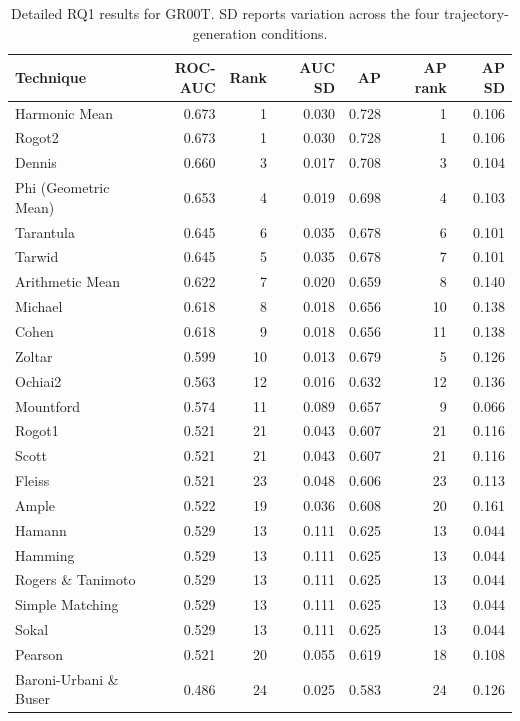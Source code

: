 \begin{table}[t]
\centering
\caption{Detailed RQ1 results for GR00T. SD reports variation across the four trajectory-generation conditions.}
\label{tab:rq1-supplementary-gr00t}
{\scriptsize
\setlength{\tabcolsep}{4pt}
\renewcommand{\arraystretch}{0.96}
\begin{tabular}{lrrrrrr}
\toprule
Technique & ROC-AUC & Rank & AUC SD & AP & AP rank & AP SD \\
\midrule
Harmonic Mean & 0.673 & 1 & 0.030 & 0.728 & 1 & 0.106 \\
Rogot2 & 0.673 & 1 & 0.030 & 0.728 & 1 & 0.106 \\
Dennis & 0.660 & 3 & 0.017 & 0.708 & 3 & 0.104 \\
Phi (Geometric Mean) & 0.653 & 4 & 0.019 & 0.698 & 4 & 0.103 \\
Tarantula & 0.645 & 6 & 0.035 & 0.678 & 6 & 0.101 \\
Tarwid & 0.645 & 5 & 0.035 & 0.678 & 7 & 0.101 \\
Arithmetic Mean & 0.622 & 7 & 0.020 & 0.659 & 8 & 0.140 \\
Michael & 0.618 & 8 & 0.018 & 0.656 & 10 & 0.138 \\
Cohen & 0.618 & 9 & 0.018 & 0.656 & 11 & 0.138 \\
Zoltar & 0.599 & 10 & 0.013 & 0.679 & 5 & 0.126 \\
Ochiai2 & 0.563 & 12 & 0.016 & 0.632 & 12 & 0.136 \\
Mountford & 0.574 & 11 & 0.089 & 0.657 & 9 & 0.066 \\
Rogot1 & 0.521 & 21 & 0.043 & 0.607 & 21 & 0.116 \\
Scott & 0.521 & 21 & 0.043 & 0.607 & 21 & 0.116 \\
Fleiss & 0.521 & 23 & 0.048 & 0.606 & 23 & 0.113 \\
Ample & 0.522 & 19 & 0.036 & 0.608 & 20 & 0.161 \\
Hamann & 0.529 & 13 & 0.111 & 0.625 & 13 & 0.044 \\
Hamming & 0.529 & 13 & 0.111 & 0.625 & 13 & 0.044 \\
Rogers \& Tanimoto & 0.529 & 13 & 0.111 & 0.625 & 13 & 0.044 \\
Simple Matching & 0.529 & 13 & 0.111 & 0.625 & 13 & 0.044 \\
Sokal & 0.529 & 13 & 0.111 & 0.625 & 13 & 0.044 \\
Pearson & 0.521 & 20 & 0.055 & 0.619 & 18 & 0.108 \\
Baroni-Urbani \& Buser & 0.486 & 24 & 0.025 & 0.583 & 24 & 0.126 \\

\end{tabular}}
\end{table}
